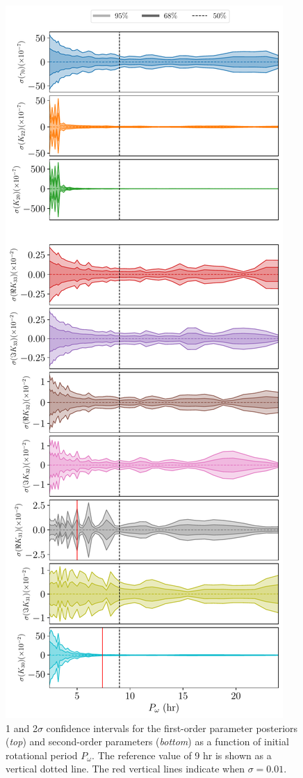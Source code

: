 \documentclass[fleqn,usenatbib]{mnras}
\begin{document}
\begin{figure}
  \centering
  \includegraphics[height=0.89\textheight]{figs/scan-period.pdf}
  \caption{1 and 2$\sigma$ confidence intervals for the first-order parameter posteriors (\textit{top}) and second-order parameters (\textit{bottom}) as a function of initial rotational period $P_\omega$. The reference value of 9 hr is shown as a vertical dotted line. The red vertical lines indicate when $\sigma = 0.01$.}
  \label{fig:scan-period}
\end{figure}
\end{document}
